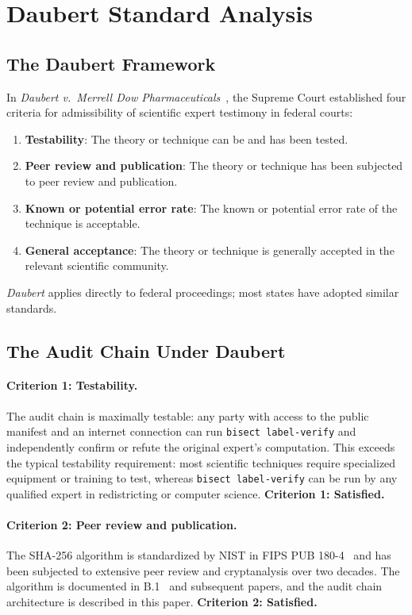 \section{Daubert Standard Analysis}
\label{sec:daubert}

\subsection{The Daubert Framework}

In \textit{Daubert v.\ Merrell Dow Pharmaceuticals}~\citep{daubert1993},
the Supreme Court established four criteria for admissibility of
scientific expert testimony in federal courts:
\begin{enumerate}
\item \textbf{Testability}: The theory or technique can be and has been tested.
\item \textbf{Peer review and publication}: The theory or technique has been
  subjected to peer review and publication.
\item \textbf{Known or potential error rate}: The known or potential error
  rate of the technique is acceptable.
\item \textbf{General acceptance}: The theory or technique is generally
  accepted in the relevant scientific community.
\end{enumerate}

\textit{Daubert} applies directly to federal proceedings; most states
have adopted similar standards.

\subsection{The Audit Chain Under Daubert}

\paragraph{Criterion 1: Testability.}
The \bisect{} audit chain is maximally testable: any party with access to
the public manifest and an internet connection can run \texttt{bisect label-verify}
and independently confirm or refute the original expert's computation.
This exceeds the typical testability requirement: most scientific techniques
require specialized equipment or training to test, whereas \texttt{bisect label-verify}
can be run by any qualified expert in redistricting or computer science.
\textbf{Criterion 1: Satisfied.}

\paragraph{Criterion 2: Peer review and publication.}
The SHA-256 algorithm is standardized by NIST in FIPS PUB 180-4~\citep{fips180}
and has been subjected to extensive peer review and cryptanalysis over two
decades.
The \bisect{} algorithm is documented in B.1~\citep{b1paper} and subsequent
papers, and the audit chain architecture is described in this paper.
\textbf{Criterion 2: Satisfied.}

